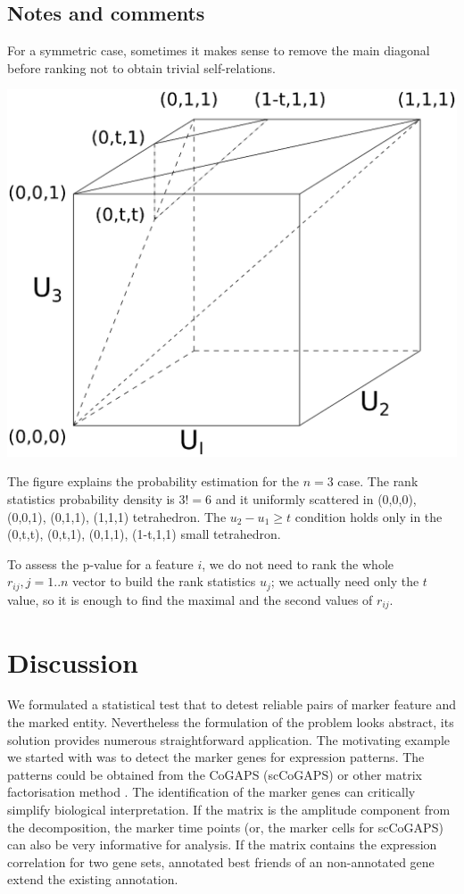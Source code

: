\documentclass{llncs}
\begin{document}
\subsection*{Notes and comments}

For a symmetric case, sometimes it makes sense to remove the main diagonal before ranking not to obtain trivial self-relations.

\includegraphics[scale=.5,trim=0 10cm 0 0, clip=true]{rank3d-nocolour}

The figure explains the probability estimation for the $n=3$ case. The rank statistics probability density is $3!=6$ and it uniformly scattered in (0,0,0), (0,0,1), (0,1,1), (1,1,1) tetrahedron. The $u_2 - u_1 \ge t$ condition holds only in the (0,t,t), (0,t,1), (0,1,1), (1-t,1,1) small tetrahedron.

To assess the p-value for a feature $i$, we do not need to rank the whole $r_{ij}, j=1..n$ vector to build the rank statistics $u_j$; we actually need only the $t$ value, so it is enough to find the maximal and the second values of $r_{ij}$.

\section{Discussion}

We formulated a statistical test that to detest reliable pairs of marker feature and the marked entity. Nevertheless the formulation of the problem looks abstract, its solution provides numerous straightforward application. The motivating example we started with was to detect the marker genes for expression patterns. The patterns could be obtained from the CoGAPS (scCoGAPS) \cite{Fertig_2016} or other matrix factorisation method \cite{Stein_2018}. The identification of the marker genes can critically simplify biological interpretation. If the matrix is the amplitude component from  the decomposition, the marker time points (or, the marker cells for scCoGAPS) can also be very informative for analysis. If the matrix contains the expression correlation for two gene sets, annotated best friends of an non-annotated gene extend the existing annotation.
\end{document}

